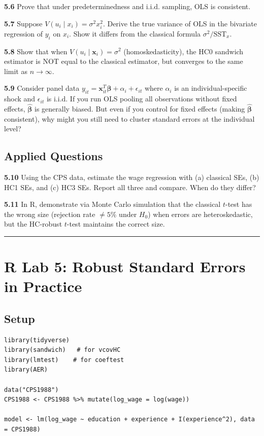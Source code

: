 \textbf{5.6} Prove that under predeterminedness and i.i.d. sampling, OLS is consistent.

\textbf{5.7} Suppose $V(u_i \mid x_i) = \sigma^2 x_i^2$. Derive the true variance of OLS in the bivariate regression of $y_i$ on $x_i$. Show it differs from the classical formula $\sigma^2/\text{SST}_x$.

\textbf{5.8} Show that when $V(u_i \mid \mathbf{x}_i) = \sigma^2$ (homoskedasticity), the HC0 sandwich estimator is NOT equal to the classical estimator, but converges to the same limit as $n \to \infty$.

\textbf{5.9} Consider panel data $y_{it} = \mathbf{x}_{it}^T\boldsymbol{\beta} + \alpha_i + \epsilon_{it}$ where $\alpha_i$ is an individual-specific shock and $\epsilon_{it}$ is i.i.d. If you run OLS pooling all observations without fixed effects, $\hat{\boldsymbol{\beta}}$ is generally biased. But even if you control for fixed effects (making $\hat{\boldsymbol{\beta}}$ consistent), why might you still need to cluster standard errors at the individual level?

\subsection{Applied Questions}

\textbf{5.10} Using the CPS data, estimate the wage regression with (a) classical SEs, (b) HC1 SEs, and (c) HC3 SEs. Report all three and compare. When do they differ?

\textbf{5.11} In R, demonstrate via Monte Carlo simulation that the classical $t$-test has the wrong size (rejection rate $\neq 5\%$ under $H_0$) when errors are heteroskedastic, but the HC-robust $t$-test maintains the correct size.

\medskip\hrule\medskip

\section{R Lab 5: Robust Standard Errors in Practice}

\subsection{Setup}

\begin{lstlisting}
library(tidyverse)
library(sandwich)   # for vcovHC
library(lmtest)    # for coeftest
library(AER)

data("CPS1988")
CPS1988 <- CPS1988 %>% mutate(log_wage = log(wage))

model <- lm(log_wage ~ education + experience + I(experience^2), data = CPS1988)
\end{lstlisting}

